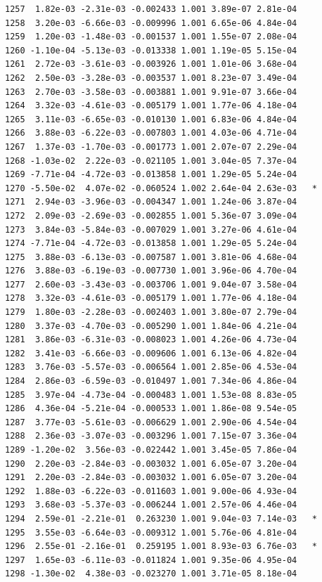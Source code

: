 \documentclass[
  letterpaper,
  DIV=11,
  numbers=noendperiod]{scrartcl}
\begin{document}
\begin{verbatim}
1257  1.82e-03 -2.31e-03 -0.002433 1.001 3.89e-07 2.81e-04    
1258  3.20e-03 -6.66e-03 -0.009996 1.001 6.65e-06 4.84e-04    
1259  1.20e-03 -1.48e-03 -0.001537 1.001 1.55e-07 2.08e-04    
1260 -1.10e-04 -5.13e-03 -0.013338 1.001 1.19e-05 5.15e-04    
1261  2.72e-03 -3.61e-03 -0.003926 1.001 1.01e-06 3.68e-04    
1262  2.50e-03 -3.28e-03 -0.003537 1.001 8.23e-07 3.49e-04    
1263  2.70e-03 -3.58e-03 -0.003881 1.001 9.91e-07 3.66e-04    
1264  3.32e-03 -4.61e-03 -0.005179 1.001 1.77e-06 4.18e-04    
1265  3.11e-03 -6.65e-03 -0.010130 1.001 6.83e-06 4.84e-04    
1266  3.88e-03 -6.22e-03 -0.007803 1.001 4.03e-06 4.71e-04    
1267  1.37e-03 -1.70e-03 -0.001773 1.001 2.07e-07 2.29e-04    
1268 -1.03e-02  2.22e-03 -0.021105 1.001 3.04e-05 7.37e-04    
1269 -7.71e-04 -4.72e-03 -0.013858 1.001 1.29e-05 5.24e-04    
1270 -5.50e-02  4.07e-02 -0.060524 1.002 2.64e-04 2.63e-03   *
1271  2.94e-03 -3.96e-03 -0.004347 1.001 1.24e-06 3.87e-04    
1272  2.09e-03 -2.69e-03 -0.002855 1.001 5.36e-07 3.09e-04    
1273  3.84e-03 -5.84e-03 -0.007029 1.001 3.27e-06 4.61e-04    
1274 -7.71e-04 -4.72e-03 -0.013858 1.001 1.29e-05 5.24e-04    
1275  3.88e-03 -6.13e-03 -0.007587 1.001 3.81e-06 4.68e-04    
1276  3.88e-03 -6.19e-03 -0.007730 1.001 3.96e-06 4.70e-04    
1277  2.60e-03 -3.43e-03 -0.003706 1.001 9.04e-07 3.58e-04    
1278  3.32e-03 -4.61e-03 -0.005179 1.001 1.77e-06 4.18e-04    
1279  1.80e-03 -2.28e-03 -0.002403 1.001 3.80e-07 2.79e-04    
1280  3.37e-03 -4.70e-03 -0.005290 1.001 1.84e-06 4.21e-04    
1281  3.86e-03 -6.31e-03 -0.008023 1.001 4.26e-06 4.73e-04    
1282  3.41e-03 -6.66e-03 -0.009606 1.001 6.13e-06 4.82e-04    
1283  3.76e-03 -5.57e-03 -0.006564 1.001 2.85e-06 4.53e-04    
1284  2.86e-03 -6.59e-03 -0.010497 1.001 7.34e-06 4.86e-04    
1285  3.97e-04 -4.73e-04 -0.000483 1.001 1.53e-08 8.83e-05    
1286  4.36e-04 -5.21e-04 -0.000533 1.001 1.86e-08 9.54e-05    
1287  3.77e-03 -5.61e-03 -0.006629 1.001 2.90e-06 4.54e-04    
1288  2.36e-03 -3.07e-03 -0.003296 1.001 7.15e-07 3.36e-04    
1289 -1.20e-02  3.56e-03 -0.022442 1.001 3.45e-05 7.86e-04    
1290  2.20e-03 -2.84e-03 -0.003032 1.001 6.05e-07 3.20e-04    
1291  2.20e-03 -2.84e-03 -0.003032 1.001 6.05e-07 3.20e-04    
1292  1.88e-03 -6.22e-03 -0.011603 1.001 9.00e-06 4.93e-04    
1293  3.68e-03 -5.37e-03 -0.006244 1.001 2.57e-06 4.46e-04    
1294  2.59e-01 -2.21e-01  0.263230 1.001 9.04e-03 7.14e-03   *
1295  3.55e-03 -6.64e-03 -0.009312 1.001 5.76e-06 4.81e-04    
1296  2.55e-01 -2.16e-01  0.259195 1.001 8.93e-03 6.76e-03   *
1297  1.65e-03 -6.11e-03 -0.011824 1.001 9.35e-06 4.95e-04    
1298 -1.30e-02  4.38e-03 -0.023270 1.001 3.71e-05 8.18e-04    

\end{verbatim}
\end{document}
